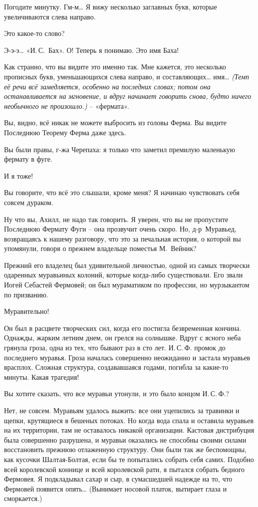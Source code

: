 \documentclass[../main.tex]{subfiles}
\begin{document}
\begin{dialogue}
 Погодите минутку. Гм-м\ldots{} Я вижу несколько заглавных букв, которые увеличиваются слева направо.

 Это какое-то слово?

 Э-э-э\ldots{} «И.\,С.~Бах». О! Теперь я понимаю. Это имя Баха!

 Как странно, что вы видите это именно так. Мне кажется, это несколько прописных букв, уменьшающихся слева направо, и составляющих\ldots{} имя\ldots{} \emph{(Темп её речи всё замедляется, особенно на последних словах; потом она останавливается на мгновение, и вдруг начинает говорить снова, будто ничего необычного не произошло.)} \--- «фермата».

 Вы, видно, всё никак не можете выбросить из головы Ферма. Вы видите Последнюю Теорему Ферма даже здесь.

 Вы были правы, г-жа Черепаха: я только что заметил премилую маленькую фермату в фуге.

 И я тоже!

 Вы говорите, что всё это слышали, кроме меня? Я начинаю чувствовать себя совсем дураком.

 Ну что вы, Ахилл, не надо так говорить. Я уверен, что вы не пропустите Последнюю Фермату Фуги \--- она прозвучит очень скоро. Но, д-р~Муравьед, возвращаясь к нашему разговору, что это за печальная история, о которой вы упомянули, говоря о прежнем владельце поместья М.~Вейник?

 Прежний его владелец был удивительной личностью, одной из самых творчески одаренных муравьиных колоний, которые когда-либо существовали. Его звали Иогей Себастей Фермовей; он был мураматиком по профессии, но мурзыкантом по призванию.

 Муравительно!

 Он был в расцвете творческих сил, когда его постигла безвременная кончина. Однажды, жарким летним днем, он грелся на солнышке. Вдруг с ясного неба грянула гроза, одна из тех, что бывают раз в сто лет. И.\,С.\,Ф. промок до последнего муравья. Гроза началась совершенно неожиданно и застала муравьев врасплох. Сложная структура, создававшаяся годами, погибла за какие-то минуты. Какая трагедия!

 Вы хотите сказать, что все муравьи утонули, и это было концом И.\,С.\,Ф.?

 Нет, не совсем. Муравьям удалось выжить: все они уцепились за травинки и щепки, крутящиеся в бешеных потоках. Но когда вода спала и оставила муравьев на их территории, там не оставалось никакой организации. Кастовая дистрибуция была совершенно разрушена, и муравьи оказались не способны своими силами восстановить прежнюю отлаженную структуру. Они были так же беспомощны, как кусочки Шалтая-Болтая, если бы те попытались собрать себя самих. Подобно всей королевской коннице и всей королевской рати, я пытался собрать бедного Фермовея. Я подкладывал сахар и сыр, в сумасшедшей надежде на то, что Фермовей появится опять\ldots{} (Вынимает носовой платок, вытирает глаза и сморкается.)


\end{dialogue}
\end{document}
